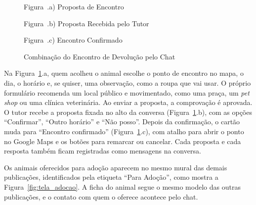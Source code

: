 \begin{figure}[H]
    \centering
    \caption{Combinação do Encontro de Devolução pelo Chat}
    \label{fig:tela_encontro_devolucao}
    \vspace{0.15cm}
    \begin{minipage}[t]{0.31\textwidth}
        \centering
        \par\vspace{0.12cm}
        {\small Figura~\thefigure.a) Proposta de Encontro}
    \end{minipage}
    \hfill
    \begin{minipage}[t]{0.31\textwidth}
        \centering
        \par\vspace{0.12cm}
        {\small Figura~\thefigure.b) Proposta Recebida pelo Tutor}
    \end{minipage}
    \hfill
    \begin{minipage}[t]{0.31\textwidth}
        \centering
        \par\vspace{0.12cm}
        {\small Figura~\thefigure.c) Encontro Confirmado}
    \end{minipage}
    \par\vspace{0.12cm}
\end{figure}

Na Figura~\ref{fig:tela_encontro_devolucao}.a, quem acolheu o animal escolhe o ponto de encontro no mapa, o dia, o horário e, se quiser, uma observação, como a roupa que vai usar. O próprio formulário recomenda um local público e movimentado, como uma praça, um \textit{pet shop} ou uma clínica veterinária. Ao enviar a proposta, a comprovação é aprovada. O tutor recebe a proposta fixada no alto da conversa (Figura~\ref{fig:tela_encontro_devolucao}.b), com as opções ``Confirmar'', ``Outro horário'' e ``Não posso''. Depois da confirmação, o cartão muda para ``Encontro confirmado'' (Figura~\ref{fig:tela_encontro_devolucao}.c), com atalho para abrir o ponto no Google Maps e os botões para remarcar ou cancelar. Cada proposta e cada resposta também ficam registradas como mensagens na conversa.

Os animais oferecidos para adoção aparecem no mesmo mural das demais publicações, identificados pela etiqueta ``Para Adoção'', como mostra a Figura~\ref{fig:tela_adocao}. A ficha do animal segue o mesmo modelo das outras publicações, e o contato com quem o oferece acontece pelo chat.

